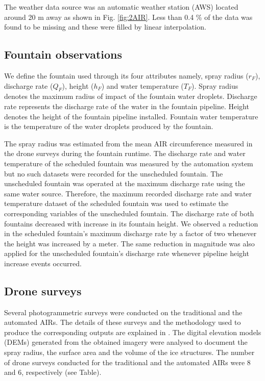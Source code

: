 \documentclass[tc, manuscript]{copernicus}
\begin{document}
The weather data source was an automatic weather station (AWS) located around 20 m away as shown in Fig.
\ref{fig:2AIR}. Less than 0.4 \% of the data was found to be missing and these were filled by linear
interpolation. 

\subsection{Fountain observations}

We define the fountain used through its four attributes namely, spray radius ($r_F$), discharge rate ($Q_F$),
height ($h_F$) and water temperature ($T_F$). Spray radius denotes the maximum radius of impact of the fountain
water droplets. Discharge rate represents the discharge rate of the water in the fountain pipeline. Height
denotes the height of the fountain pipeline installed. Fountain water temperature is the temperature of the
water droplets produced by the fountain.

The spray radius was estimated from the mean AIR circumference measured in the drone surveys during the fountain
runtime. The discharge rate and water temperature of the scheduled fountain was measured by the automation
system but no such datasets were recorded for the unscheduled fountain. The unscheduled fountain was operated at
the maximum discharge rate using the same water source. Therefore, the maximum recorded discharge rate and water
temperature dataset of the scheduled fountain was used to estimate the corresponding variables of the
unscheduled fountain. The discharge rate of both fountains decreased with increase in its fountain height. We
observed a reduction in the scheduled fountain's maximum discharge rate by a factor of two whenever the height
was increased by a meter. The same reduction in magnitude was also applied for the unscheduled fountain's
discharge rate whenever pipeline height increase events occurred. 

\subsection{Drone surveys}

Several photogrammetric surveys were conducted on the traditional and the automated AIRs. The details of these
surveys and the methodology used to produce the corresponding outputs are explained in
\cite{balasubramanianInfluenceMeteorologicalConditions2022}. The digital elevation models (DEMs) generated from
the obtained imagery were analysed to document the spray radius, the surface area and the volume of the ice
structures. The number of drone surveys conducted for the traditional and the automated AIRs were 8 and 6,
respectively (see Table). 
\end{document}
